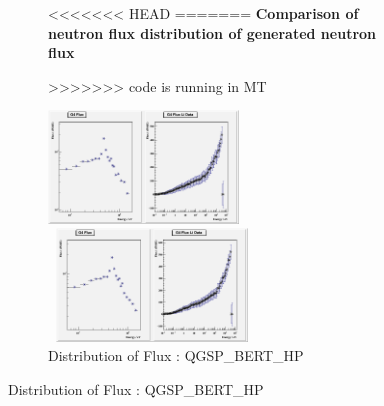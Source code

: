\documentclass[twocolumn,amsmath,amssymb]{snp}
\begin{document}
\begin{figure}


\begin{figure}
    \centering 
<<<<<<< HEAD
=======
    \textbf{Comparison of neutron flux distribution of generated neutron flux }\par\medskip
>>>>>>>  code is running in MT
    \begin{minipage}[b]{0.4\textwidth}
        \includegraphics [height=30mm, width=55 mm] {FluxBIC.png}
        \caption{\small Distribution of Flux : QGSP\_BIC\_HP}
    \end{minipage}
    \begin{minipage}[b]{0.4\textwidth}
        \includegraphics [height=30mm, width=55mm] {FluxBERT.png}
        \caption{\small Distribution of Flux : QGSP\_BERT\_HP}
    \end{minipage}
\end{figure}




\end{figure}
\end{document}
